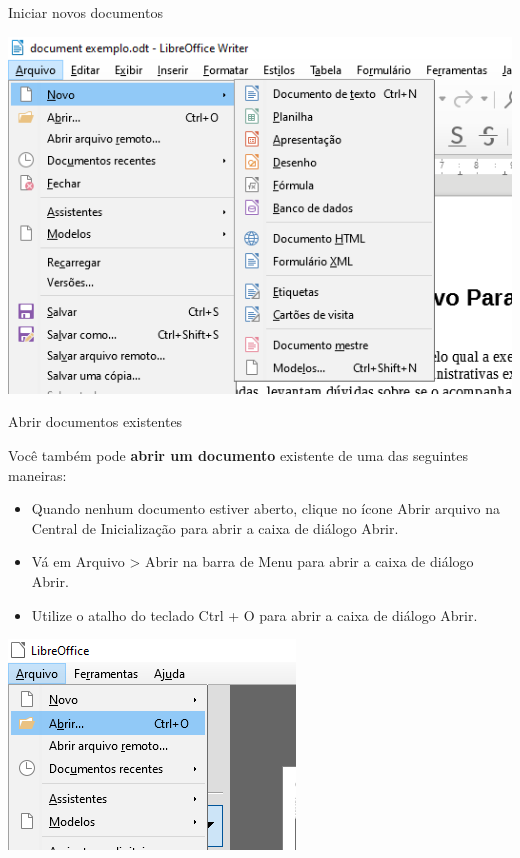 \begin{frame}{Iniciar novos documentos}

	\centering
	\includegraphics[width=0.8\linewidth]{Figuras/Ch04/fig29}

\end{frame}


\begin{frame}{Abrir documentos existentes}
	\begin{block}{}
		Você também pode \textbf{abrir um documento} existente de uma das seguintes maneiras:
		\begin{itemize}
			\item Quando nenhum documento estiver aberto, clique no ícone Abrir arquivo na Central de Inicialização para abrir a caixa de diálogo Abrir.
			\item Vá em Arquivo > Abrir na barra de Menu para abrir a caixa de diálogo Abrir.
			\item Utilize o atalho do teclado Ctrl + O para abrir a caixa de diálogo Abrir.
		\end{itemize}
	\end{block}

	\centering
	\includegraphics[width=0.4\linewidth]{Figuras/Ch04/fig30}
\end{frame}


